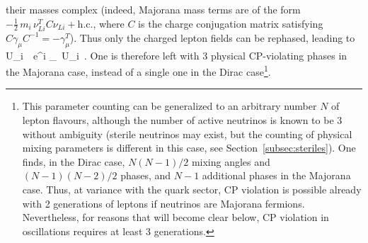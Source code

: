 their masses complex (indeed, Majorana mass terms are of the form
$- \frac{1}{2}\, m_i\, \nu^T_{L i} C \nu_{L i} + \mbox{h.c.}$, where $C$ is the charge
conjugation matrix satisfying $C \gamma_\mu C^{-1} = - \gamma^T_\mu$).
Thus only the charged lepton fields can be rephased, leading to
%
\be
  U_{\alpha i}\, \to\, e^{i \phi_\alpha}\, U_{\alpha i}\, .
\eeq
%
One is therefore left with 3 physical CP-violating phases in the Majorana case,
instead of a single one in the Dirac case\footnote{This parameter counting can be
generalized to an arbitrary number $N$ of lepton flavours,
although the number of active neutrinos
is known to be 3 without ambiguity (sterile neutrinos may exist, but the counting
of physical mixing parameters is different in this case, see Section~\ref{subsec:steriles}).
One finds, in the Dirac case, $N(N-1)/2$ mixing angles
and $(N-1)(N-2)/2$ phases, and $N-1$ additional phases in the Majorana case.
Thus, at variance with the quark sector, CP violation is possible already with 2 generations
of leptons if neutrinos are Majorana fermions. Nevertheless, for reasons that will become clear below,
CP violation in oscillations requires at least 3 generations.}.


